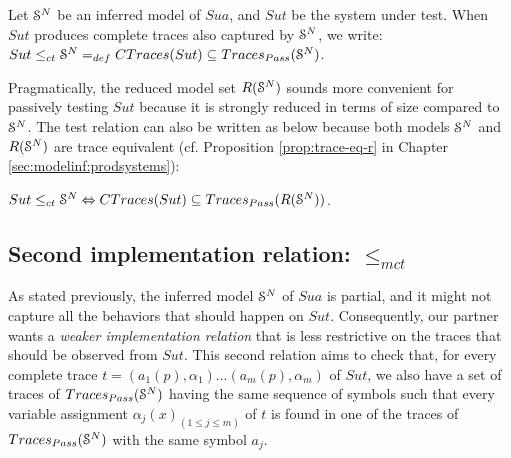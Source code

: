 \begin{definition}
\label{rel:impl1}

Let $\EuScript{S}^{N}$ be an inferred model of $\mathit{Sua}$, and
$\mathit{Sut}$ be the system under test. When $\mathit{Sut}$
produces complete traces also captured by $\EuScript{S}^{N}$, we
write: ${Sut} \leq_{ct} \EuScript{S}^{N} =_{def} CTraces({Sut})
\subseteq  Traces_{Pass}(\EuScript{S}^{N})$.
\end{definition}

Pragmatically, the reduced model set $R(\EuScript{S}^{N})$ sounds
more convenient for passively testing $\mathit{Sut}$ because it
is strongly reduced in terms of size compared to
$\EuScript{S}^{N}$. The test relation can also be written
as below because both models $\EuScript{S}^{N}$ and
$R(\EuScript{S}^{N})$ are trace equivalent (cf. Proposition
\ref{prop:trace-eq-r} in Chapter \ref{sec:modelinf:prodsystems}):

\begin{proposition}
\label{rel:impl12}
${Sut} \leq_{ct} \EuScript{S}^{N} \Leftrightarrow CTraces({Sut})
\subseteq  Traces_{Pass}(R(\EuScript{S}^{N}))$.
\end{proposition}

\subsection{Second implementation relation: $\leq_{mct}$}

As stated previously, the inferred model $\EuScript{S}^{N}$ of
$\mathit{Sua}$ is partial, and it might not capture all the
behaviors that should happen on $\mathit{Sut}$. Consequently,
our partner wants a \emph{weaker implementation relation} that is
less restrictive on the traces that should be observed from
$\mathit{Sut}$. This second relation aims to
check that, for every complete trace $t=(a_1(p), \alpha_1) \dots
(a_m(p), \alpha_m)$ of $\mathit{Sut}$, we also have a set of traces of
$Traces_{Pass}(\EuScript{S}^{N})$ having the same sequence of
symbols such that every variable assignment $\alpha_j(x)_{(1 \leq
j \leq m)}$ of $t$ is found in one of the traces of
$Traces_{Pass}(\EuScript{S}^{N})$ with the same symbol $a_j$.

